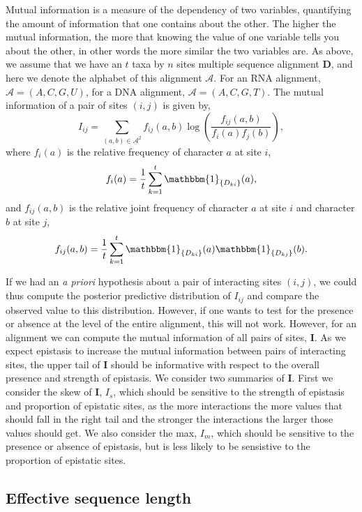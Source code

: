 \documentclass[11pt]{article}
\begin{document}
Mutual information is a measure of the dependency of two variables, quantifying the amount of information that one contains about the other.
The higher the mutual information, the more that knowing the value of one variable tells you about the other, in other words the more similar the two variables are.
As above, we assume that we have an $t$ taxa by $n$ sites multiple sequence alignment $\boldsymbol{D}$, and here we denote the alphabet of this alignment $\mathcal{A}$.
For an RNA alignment, $\mathcal{A} = (A,C,G,U)$, for a DNA alignment, $\mathcal{A} = (A,C,G,T)$.
The mutual information of a pair of sites $(i,j)$ is given by,
\[
I_{ij} = \sum_{(a,b)\in\mathcal{A}^2}f_{ij}(a,b)\log\left(\frac{f_{ij}(a,b)}{f_i(a)f_j(b)}\right),
\]
where $f_i(a)$ is the relative frequency of character $a$ at site $i$,
\[
f_i(a) = \frac{1}{t}\sum_{k=1}^{t}\mathbbm{1}_{\{D_{ki}\}}(a),
\]
and $f_{ij}(a,b)$ is the relative joint frequency of character $a$ at site $i$ and character $b$ at site $j$,
\[
f_{ij}(a,b) = \frac{1}{t}\sum_{k=1}^{t}\mathbbm{1}_{\{D_{ki}\}}(a) \mathbbm{1}_{\{D_{kj}\}}(b).
\]

If we had an \textit{a priori} hypothesis about a pair of interacting sites $(i,j)$, we could thus compute the posterior predictive distribution of $I_{ij}$ and compare the observed value to this distribution.
However, if one wants to test for the presence or absence at the level of the entire alignment, this will not work.
However, for an alignment we can compute the mutual information of all pairs of sites, $\boldsymbol{I}$.
As we expect epistasis to increase the mutual information between pairs of interacting sites, the upper tail of $\boldsymbol{I}$ should be informative with respect to the overall presence and strength of epistasis.
We consider two summaries of $\boldsymbol{I}$.
First we consider the skew of $\boldsymbol{I}$, $I_s$, which should be sensitive to the strength of epistasis and proportion of epistatic sites, as the more interactions the more values that should fall in the right tail and the stronger the interactions the larger those values should get.
We also consider the max, $I_m$, which should be sensitive to the presence or absence of epistasis, but is less likely to be sensistive to the proportion of epistatic sites.

\subsection*{Effective sequence length}
\end{document}

